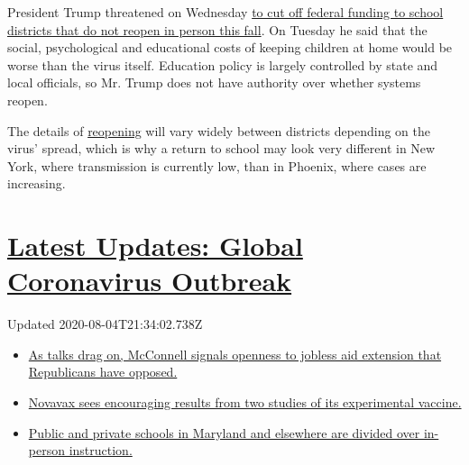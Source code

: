 President Trump threatened on Wednesday
\href{https://www.nytimes3xbfgragh.onion/2020/07/08/us/politics/trump-schools-reopening.html}{to
cut off federal funding to school districts that do not reopen in person
this fall}. On Tuesday he said that the social, psychological and
educational costs of keeping children at home would be worse than the
virus itself. Education policy is largely controlled by state and local
officials, so Mr. Trump does not have authority over whether systems
reopen.

The details of
\href{https://www.nytimes3xbfgragh.onion/2020/07/16/upshot/coronavirus-school-reopening-private-public-gap.html}{reopening}
will vary widely between districts depending on the virus' spread, which
is why a return to school may look very different in New York, where
transmission is currently low, than in Phoenix, where cases are
increasing.

\hypertarget{latest-updates-global-coronavirus-outbreak}{%
\section{\texorpdfstring{\href{https://www.nytimes3xbfgragh.onion/2020/08/04/world/coronavirus-cases.html?action=click\&pgtype=Article\&state=default\&region=MAIN_CONTENT_1\&context=storylines_live_updates}{Latest
Updates: Global Coronavirus
Outbreak}}{Latest Updates: Global Coronavirus Outbreak}}\label{latest-updates-global-coronavirus-outbreak}}

Updated 2020-08-04T21:34:02.738Z

\begin{itemize}
\tightlist
\item
  \href{https://www.nytimes3xbfgragh.onion/2020/08/04/world/coronavirus-cases.html?action=click\&pgtype=Article\&state=default\&region=MAIN_CONTENT_1\&context=storylines_live_updates\#link-2daa96b5}{As
  talks drag on, McConnell signals openness to jobless aid extension
  that Republicans have opposed.}
\item
  \href{https://www.nytimes3xbfgragh.onion/2020/08/04/world/coronavirus-cases.html?action=click\&pgtype=Article\&state=default\&region=MAIN_CONTENT_1\&context=storylines_live_updates\#link-1228a480}{Novavax
  sees encouraging results from two studies of its experimental
  vaccine.}
\item
  \href{https://www.nytimes3xbfgragh.onion/2020/08/04/world/coronavirus-cases.html?action=click\&pgtype=Article\&state=default\&region=MAIN_CONTENT_1\&context=storylines_live_updates\#link-4825b93}{Public
  and private schools in Maryland and elsewhere are divided over
  in-person instruction.}
\end{itemize}

